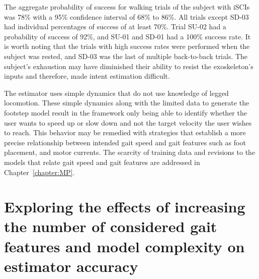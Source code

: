 The aggregate probability of success for walking trials of the subject with iSCIs was 78\% with a 95\% confidence interval of 68\% to 86\%. All trials except SD-03 had individual percentages of success of at least 70\%. Trial SU-02 had a probability of success of 92\%, and SU-01 and SD-01 had a 100\% success rate. It is worth noting that the trials with high success rates were performed when the subject was rested, and SD-03 was the last of multiple back-to-back trials. The subject's exhaustion may have diminished their ability to resist the exoskeleton's inputs and therefore, made intent estimation difficult.

The estimator uses simple dynamics that do not use knowledge of legged locomotion. These simple dynamics along with the limited data to generate the footstep model result in the framework only being able to identify whether the user wants to speed up or slow down and not the target velocity the user wishes to reach. This behavior may be remedied with strategies that establish a more precise relationship between intended gait speed and gait features such as foot placement, and motor currents. The scarcity of training data and revisions to the models that relate gait speed and gait features are addressed in Chapter~\ref{chapter:MP}.

\section{Exploring the effects of increasing the number of considered gait features and model complexity on estimator accuracy}\label{sec:add_analysis}


